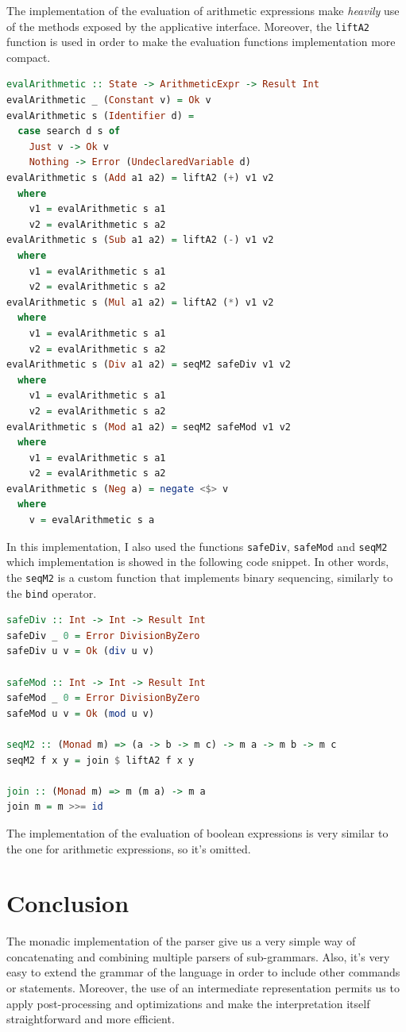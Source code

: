 \documentclass[12pt,a4paper]{article}
\begin{document}
The implementation of the evaluation of arithmetic expressions make \textit{heavily} use of the methods exposed by the applicative interface.
Moreover, the \texttt{liftA2} function is used in order to make the evaluation functions implementation more compact.
\begin{lstlisting}[language=Haskell, style=custom-style]
evalArithmetic :: State -> ArithmeticExpr -> Result Int
evalArithmetic _ (Constant v) = Ok v
evalArithmetic s (Identifier d) =
  case search d s of
    Just v -> Ok v
    Nothing -> Error (UndeclaredVariable d)
evalArithmetic s (Add a1 a2) = liftA2 (+) v1 v2
  where
    v1 = evalArithmetic s a1
    v2 = evalArithmetic s a2
evalArithmetic s (Sub a1 a2) = liftA2 (-) v1 v2
  where
    v1 = evalArithmetic s a1
    v2 = evalArithmetic s a2
evalArithmetic s (Mul a1 a2) = liftA2 (*) v1 v2
  where
    v1 = evalArithmetic s a1
    v2 = evalArithmetic s a2
evalArithmetic s (Div a1 a2) = seqM2 safeDiv v1 v2
  where
    v1 = evalArithmetic s a1
    v2 = evalArithmetic s a2
evalArithmetic s (Mod a1 a2) = seqM2 safeMod v1 v2
  where
    v1 = evalArithmetic s a1
    v2 = evalArithmetic s a2
evalArithmetic s (Neg a) = negate <$> v
  where
    v = evalArithmetic s a
\end{lstlisting}
In this implementation, I also used the functions \texttt{safeDiv}, \texttt{safeMod} and \texttt{seqM2} which implementation is showed in the following code snippet.
In other words, the \texttt{seqM2} is a custom function that implements binary sequencing, similarly to the \texttt{bind} operator.
\begin{lstlisting}[language=Haskell, style=custom-style]
safeDiv :: Int -> Int -> Result Int
safeDiv _ 0 = Error DivisionByZero
safeDiv u v = Ok (div u v)

safeMod :: Int -> Int -> Result Int
safeMod _ 0 = Error DivisionByZero
safeMod u v = Ok (mod u v)

seqM2 :: (Monad m) => (a -> b -> m c) -> m a -> m b -> m c
seqM2 f x y = join $ liftA2 f x y

join :: (Monad m) => m (m a) -> m a
join m = m >>= id
\end{lstlisting}
The implementation of the evaluation of boolean expressions is very similar to the one for arithmetic expressions, so it's omitted.

\section*{Conclusion}
The monadic implementation of the parser give us a very simple way of concatenating and combining multiple parsers of sub-grammars.
Also, it's very easy to extend the grammar of the language in order to include other commands or statements.
Moreover, the use of an intermediate representation permits us to apply post-processing and optimizations and make the interpretation itself straightforward and more efficient.
\end{document}
